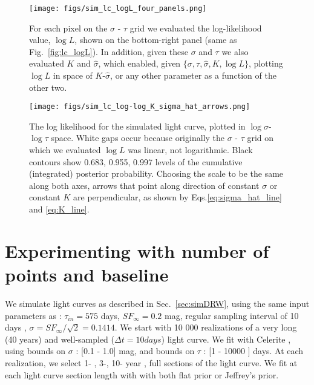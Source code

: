 \documentclass[fleqn,usenatbib]{mnras}  %
\begin{document}
\begin{figure*}
\texttt{[image: figs/sim\_lc\_logL\_four\_panels.png]}
\caption{For each pixel on the  $\sigma$ - $\tau$ grid we evaluated the log-likelihood value, $\log{L}$, shown on the bottom-right panel (same as Fig.~\ref{fig:lc_logL}). In addition, given these  $\sigma$ and $\tau$ we also evaluated $K$ and $\hat{\sigma}$, which enabled, given $\{ \sigma, \tau, \hat{\sigma}, K, \log{L} \}$, plotting $\log{L}$ in space of $K$-$\hat{\sigma}$, or any other parameter as a function of the other two. }
\label{fig:lc_logL_panels}
\end{figure*} 

\begin{figure}
\texttt{[image: figs/sim\_lc\_log-log\_K\_sigma\_hat\_arrows.png]}
\caption{The log likelihood for the simulated light curve, plotted in  $\log{\sigma}$-$\log{\tau}$ space.  White gaps occur because originally the   $\sigma$ - $\tau$ grid on which we evaluated $\log{L}$ was linear, not logarithmic.  Black contours show 0.683, 0.955, 0.997 levels of the cumulative (integrated) posterior probability. Choosing the scale to be the same along both axes,  arrows that point along direction of constant $\hat{\sigma}$ or constant $K$ are perpendicular, as shown by Eqs.\ref{eq:sigma_hat_line} and \ref{eq:K_line}. }
\label{fig:lc_logL_arrows}
\end{figure} 


\section{Experimenting with number of points and baseline}

We simulate  light curves as described in Sec.~\ref{sec:simDRW}, using the same input parameters as \cite{macleod2011} : $\tau_{in} = 575 $ days, $SF_{\infty}= 0.2 $ mag, regular sampling interval of 10 days ,  $\sigma = SF_{\infty} / \sqrt{2} = 0.1414 $.  We start with 10 000 realizations of a very long (40 years)  and well-sampled  ($\Delta t = 10 days$) light curve.  We fit with Celerite , using bounds on $\sigma$ : [0.1 - 1.0] mag,  and bounds on $\tau$ : [1 - 10000 ] days. At each realization,  we select 1- , 3-, 10- year , full sections of the light curve. We fit at each light curve section length with   with both flat prior or Jeffrey's prior. 
\end{document}
